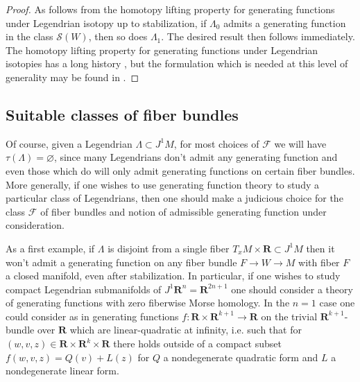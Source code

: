 \documentclass{amsart}
\newcommand\cF{\mathcal{F}}
\def\bR{\mathbf{R}}
\theoremstyle{definition}
\theoremstyle{remark}
\newtheorem{inductive lemma}[theorem]{Inductive Lemma}
\begin{document}
\begin{proof}As follows from the homotopy lifting property for generating functions under Legendrian isotopy up to stabilization, if $\Lambda_0$ admits a generating function in the class $\mathcal{S}(W)$, then so does $\Lambda_1$. The desired result then follows immediately. The homotopy lifting property for generating functions under Legendrian isotopies has a long history \cite{S86, C96}, but the formulation which is needed at this level of generality may be found in \cite{EG98}.
\end{proof} 


 
 \subsection{Suitable classes of fiber bundles}\label{sec: class}

Of course, given a Legendrian $\Lambda \subset J^1M$, for most choices of $\cF$ we will have $\tau(\Lambda)=\varnothing$, since many Legendrians don't admit any generating function and even those which do will only admit generating functions on certain fiber bundles. More generally, if one wishes to use generating function theory to study a particular class of Legendrians, then one should make a judicious choice for the class $\cF$ of fiber bundles and notion of admissible generating function under consideration.

As a first example, if $\Lambda$ is disjoint from a single fiber $T_xM \times \bR \subset J^1M$ then it won't admit a generating function on any fiber bundle $F \to W \to M$ with fiber $F$ a closed manifold, even after stabilization. In particular, if one wishes to study compact Legendrian submanifolds of $J^1\bR^n=\bR^{2n+1}$ one should consider a theory of generating functions with zero fiberwise Morse homology. In the $n=1$ case one could consider as in \cite{JT} generating functions $f:\bR \times \bR^{k+1}\to \bR$ on the trivial $\bR^{k+1}$-bundle over $\bR$ which are linear-quadratic at infinity, i.e. such that for $(w,v,z) \in \bR \times \bR^k \times \bR$ there holds outside of a compact subset $f(w,v,z)=Q(v)+L(z)$ for $Q$ a nondegenerate quadratic form and $L$ a nondegenerate linear form. 
\end{document}
